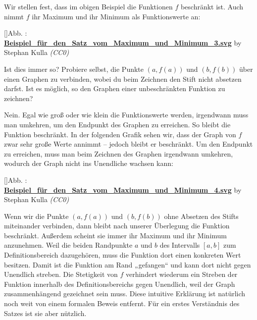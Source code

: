 \documentclass[fontsize=9pt,
               parskip=half-,
               DIV=14,
               listof=chapterentry,
               tocflat]{scrbook}
\newcounter{imagelabel}
\begin{document}
Wir stellen fest, dass im obigen Beispiel die Funktionen $f$ beschränkt ist. Auch nimmt $f$ ihr Maximum und ihr Minimum als Funktionswerte an:

[]{Abb. : \protect\href{https://commons.wikimedia.org/wiki/File:Beispiel_für_den_Satz_vom_Maximum_und_Minimum_3.svg}{\textbf{Beispiel\allowbreak\_für\allowbreak\_den\allowbreak\_Satz\allowbreak\_vom\allowbreak\_Maximum\allowbreak\_und\allowbreak\_Minimum\allowbreak\_3.svg}} by Stephan Kulla \textit{(CC0)}}\begin{center}
\end{center}

Ist dies immer so? Probiere selbst, die Punkte $(a,f(a))$ und $(b,f(b))$ über einen Graphen zu verbinden, wobei du beim Zeichnen den Stift nicht absetzen darfst. Ist es möglich, so den Graphen einer unbeschränkten Funktion zu zeichnen?

Nein. Egal wie groß oder wie klein die Funktionswerte werden, irgendwann muss man umkehren, um den Endpunkt des Graphen zu erreichen. So bleibt die Funktion beschränkt. In der folgenden Grafik sehen wir, dass der Graph von $f$ zwar sehr große Werte annimmt – jedoch bleibt er beschränkt. Um den Endpunkt zu erreichen, muss man beim Zeichnen des Graphen irgendwann umkehren, wodurch der Graph nicht ins Unendliche wachsen kann:

[]{Abb. : \protect\href{https://commons.wikimedia.org/wiki/File:Beispiel_für_den_Satz_vom_Maximum_und_Minimum_4.svg}{\textbf{Beispiel\allowbreak\_für\allowbreak\_den\allowbreak\_Satz\allowbreak\_vom\allowbreak\_Maximum\allowbreak\_und\allowbreak\_Minimum\allowbreak\_4.svg}} by Stephan Kulla \textit{(CC0)}}\begin{center}
\end{center}

Wenn wir die Punkte $(a,f(a))$ und $(b,f(b))$ ohne Absetzen des Stifts miteinander verbinden, dann bleibt nach unserer Überlegung die Funktion beschränkt. Außerdem scheint sie immer ihr Maximum und ihr Minimum anzunehmen. Weil die beiden Randpunkte $a$ und $b$ des Intervalls $[a,b]$ zum Definitionsbereich dazugehören, muss die Funktion dort einen konkreten Wert besitzen. Damit ist die Funktion am Rand „gefangen“ und kann dort nicht gegen Unendlich streben. Die Stetigkeit von $f$ verhindert wiederum ein Streben der Funktion innerhalb des Definitionsbereichs gegen Unendlich, weil der Graph zusammenhängend gezeichnet sein muss. Diese intuitive Erklärung ist natürlich noch weit von einem formalen Beweis entfernt. Für ein erstes Verständnis des Satzes ist sie aber nützlich.
\end{document}
